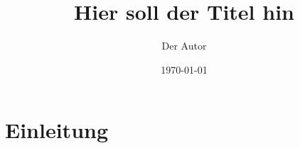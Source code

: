 \documentclass[a4paper]{scrartcl}
\begin{document}
\title{Hier soll der Titel hin}
\author{Der Autor}
\date{\today}

\maketitle


\tableofcontents



\section{Einleitung}




\end{document}
